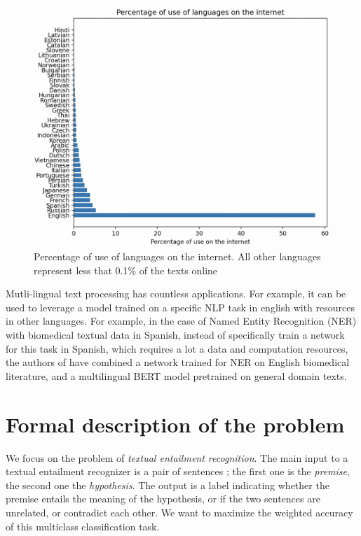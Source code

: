 \documentclass[final]{cvpr}
\begin{document}
\begin{figure}[ht]
	\centering
	\includegraphics[width=\columnwidth]{figures/percentageLanguages.png}
	\caption{Percentage of use of languages on the internet. All other languages represent less that 0.1\% of the texts online}
    \label{fig:percentageLanguages}
\end{figure}

Mutli-lingual text processing has countless applications. For example, it can be used to leverage a model trained on a specific NLP task in english with resources in other languages. For example, in the case of Named Entity Recognition (NER) with biomedical textual data in Spanish, instead of specifically train a network for this task in Spanish, which requires a lot a data and computation resources, the authors of \cite{Kai2019} have combined a network trained for NER on English biomedical literature, and a multilingual BERT model pretrained on general domain texts. 

\section{Formal description of the problem}

We focus on the problem of \textit{textual entailment recognition}. The main input to a textual entailment recognizer is a pair of sentences ; the first one is the \textit{premise}, the second one the \textit{hypothesis}. The output is a label indicating whether the premise entails the meaning of the hypothesis, or if the two sentences are unrelated, or contradict each other. We want to maximize the weighted accuracy of this multiclass classification task.
\end{document}
